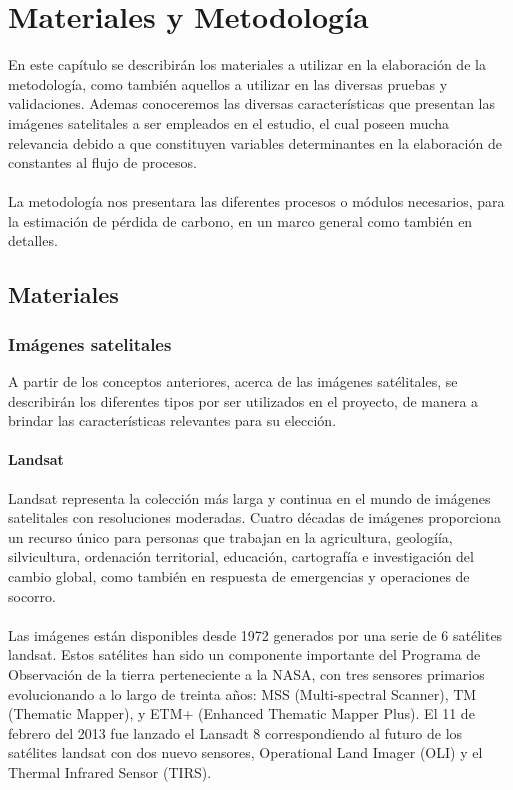 \newpage{\ } 
\thispagestyle{empty} 

\chapter{Materiales y Metodolog\'ia}
En este cap\'itulo se describir\'an los materiales a utilizar en la elaboraci\'on de la metodolog\'ia, como tambi\'en aquellos a utilizar en las diversas pruebas y validaciones. Ademas conoceremos las diversas caracter\'isticas que presentan las im\'agenes satelitales a ser empleados en el estudio, el cual poseen mucha relevancia debido a que constituyen variables determinantes en la elaboraci\'on de constantes al flujo de procesos.\\~\\
La metodolog\'ia nos presentara las diferentes procesos o m\'odulos necesarios, para la estimaci\'on de p\'erdida de carbono, en un marco general como tambi\'en en detalles.
\section{Materiales}
\subsection{Im\'agenes satelitales}
A partir de los conceptos anteriores, acerca de las im\'agenes sat\'elitales, se describir\'an los diferentes tipos por ser utilizados en el proyecto, de manera a brindar las caracter\'isticas relevantes para su elecci\'on. 
\subsubsection{Landsat}\label{sec:landsat}
Landsat representa la colecci\'on m\'as larga y continua en el mundo de im\'agenes satelitales con resoluciones moderadas. Cuatro d\'ecadas de im\'agenes proporciona un recurso \'unico para personas que trabajan en la agricultura, geologí\'ia, silvicultura, ordenaci\'on territorial, educaci\'on, cartograf\'ia e investigaci\'on del cambio global, como tambi\'en en respuesta de emergencias y operaciones de socorro\cite{landsatNasa}.\\~\\
Las im\'agenes est\'an disponibles desde 1972 generados por una serie de 6 sat\'elites landsat. Estos sat\'elites han sido un componente importante del Programa de Observaci\'on de la tierra perteneciente a la NASA, con tres sensores primarios evolucionando a lo largo de treinta años: MSS (Multi-spectral Scanner), TM (Thematic Mapper), y ETM+ (Enhanced Thematic Mapper Plus). 
El 11 de febrero del 2013 fue lanzado el Lansadt 8 correspondiendo al futuro de los sat\'elites landsat con dos nuevo sensores, Operational Land Imager (OLI) y el Thermal Infrared Sensor (TIRS).


